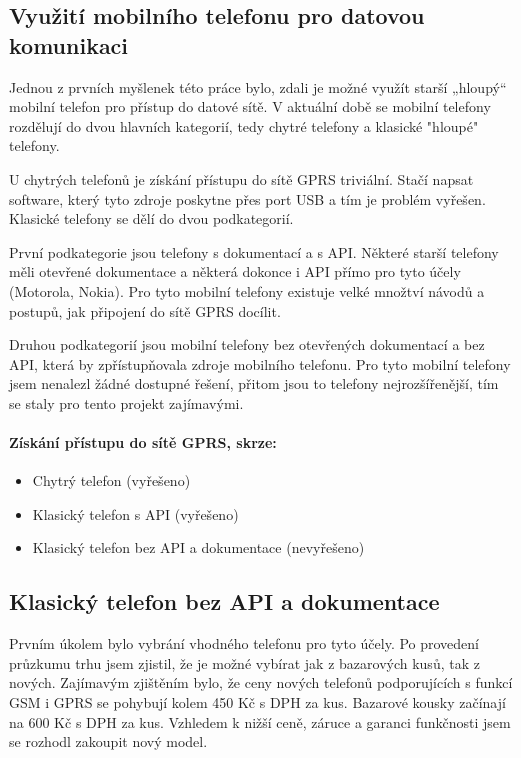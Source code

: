 \documentclass[FM,DP]{tulthesis}  %
\begin{document}
\subsection{Využití mobilního telefonu pro datovou komunikaci}
Jednou z prvních myšlenek této práce bylo, zdali je možné využít starší „hloupý“ mobilní telefon pro přístup do datové sítě. V aktuální době se mobilní telefony rozdělují do dvou hlavních kategorií, tedy chytré telefony a klasické "hloupé" telefony.

U chytrých telefonů je získání přístupu do sítě GPRS triviální. Stačí napsat software, který tyto zdroje poskytne přes port USB a tím je problém vyřešen. Klasické telefony se dělí do dvou podkategorií. 

První podkategorie jsou telefony s dokumentací a s API. Některé starší telefony měli otevřené dokumentace a některá dokonce i API přímo pro tyto účely (Motorola, Nokia). Pro tyto mobilní telefony existuje velké množtví návodů a postupů, jak připojení do sítě GPRS docílit. 

Druhou podkategorií jsou mobilní telefony bez otevřených dokumentací a bez API, která by zpřístupňovala zdroje mobilního telefonu. Pro tyto mobilní telefony jsem nenalezl žádné dostupné řešení, přitom jsou to telefony nejrozšířenější, tím se staly pro tento projekt zajímavými.

\paragraph{Získání přístupu do sítě GPRS, skrze:}
\begin{itemize}
\item Chytrý telefon (vyřešeno)
\item Klasický telefon s API (vyřešeno)
\item Klasický telefon bez API a dokumentace (nevyřešeno)
\end{itemize} 

\subsection{Klasický telefon bez API a dokumentace}
Prvním úkolem bylo vybrání vhodného telefonu pro tyto účely. Po provedení průzkumu trhu jsem zjistil, že je možné vybírat jak z bazarových kusů, tak z nových. Zajímavým zjištěním bylo, že ceny nových telefonů podporujících s funkcí GSM i GPRS se pohybují kolem 450 Kč s DPH za kus. Bazarové kousky začínají na 600 Kč s DPH za kus. Vzhledem k nižší ceně, záruce a garanci funkčnosti jsem se rozhodl zakoupit nový model.
\end{document}
